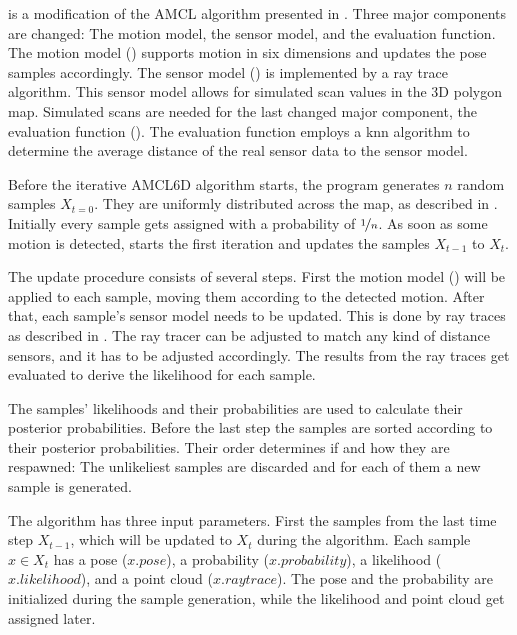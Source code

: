 \documentclass[Thesis.tex]{subfiles}
\begin{document}
%
 is a modification of the \gls{AMCL} algorithm presented in \cite{ThrunBurgardFox:2005}. Three major components are changed: The motion model, the sensor model, and the evaluation function. The motion model () supports motion in six dimensions and updates the pose samples accordingly. The sensor model () is implemented by a ray trace algorithm. This sensor model allows for simulated scan values in the 3D polygon map. Simulated scans are needed for the last changed major component, the evaluation function (). The evaluation function employs a \gls{knn} algorithm to determine the average distance of the real sensor data to the sensor model.

Before the iterative \gls{AMCL6D} algorithm starts, the program generates $n$ random samples $X_{t=0}$. They are uniformly distributed across the map, as described in . Initially every sample gets assigned with a probability of $\nicefrac{1}{n}$. As soon as some motion is detected,  starts the first iteration and updates the samples $X_{t-1}$ to $X_{t}$.

The update procedure consists of several steps. First the motion model () will be applied to each sample, moving them according to the detected motion. After that, each sample's sensor model needs to be updated. This is done by ray traces as described in . The ray tracer can be adjusted to match any kind of distance sensors, and it has to be adjusted accordingly. The results from the ray traces get evaluated to derive the likelihood for each sample.

The samples' likelihoods and their probabilities are used to calculate their posterior probabilities. Before the last step the samples are sorted according to their posterior probabilities. Their order determines if and how they are respawned: The unlikeliest samples are discarded and for each of them a new sample is generated.

\smallskip

The algorithm has three input parameters. First the samples from the last time step $X_{t-1}$, which will be updated to $X_t$ during the algorithm. Each sample $x \in X_t$ has a pose ($x.pose$), a probability ($x.probability$), a likelihood ($x.likelihood$), and a point cloud ($x.raytrace$). The pose and the probability are initialized during the sample generation, while the likelihood and point cloud get assigned later.
\end{document}
